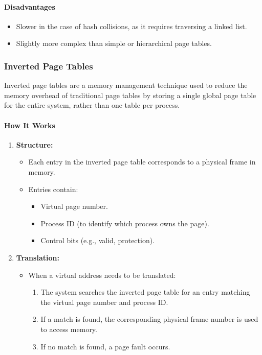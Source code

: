 \documentclass{article}
\begin{document}
\paragraph{Disadvantages}
\begin{itemize}
    \item Slower in the case of hash collisions, as it requires traversing a linked list.
    \item Slightly more complex than simple or hierarchical page tables.
\end{itemize}

\subsubsection{Inverted Page Tables}

Inverted page tables are a memory management technique used to reduce the memory overhead of traditional page tables by storing a single global page table for the entire system, rather than one table per process.

\paragraph{How It Works}
\begin{enumerate}
    \item \textbf{Structure:}
    \begin{itemize}
        \item Each entry in the inverted page table corresponds to a physical frame in memory.
        \item Entries contain:
        \begin{itemize}
            \item Virtual page number.
            \item Process ID (to identify which process owns the page).
            \item Control bits (e.g., valid, protection).
        \end{itemize}
    \end{itemize}

    \item \textbf{Translation:}
    \begin{itemize}
        \item When a virtual address needs to be translated:
        \begin{enumerate}
            \item The system searches the inverted page table for an entry matching the virtual page number and process ID.
            \item If a match is found, the corresponding physical frame number is used to access memory.
            \item If no match is found, a page fault occurs.
        \end{enumerate}
    \end{itemize}
\end{enumerate}
\end{document}
